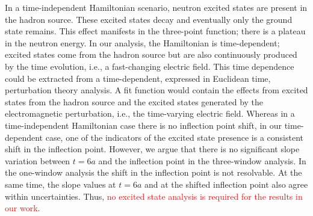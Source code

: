 In a time-independent Hamiltonian scenario, neutron excited states are present
in the hadron source. These excited states decay and eventually only the ground state
remains. This effect manifests in the three-point function; there is a plateau in the
neutron energy. 
In our analysis, the Hamiltonian is time-dependent; excited states 
come from the hadron source but are also continuously produced by the time 
evolution, i.e., a fast-changing electric field. This time dependence could be
extracted from a time-dependent, expressed in Euclidean time, perturbation theory
analysis. A fit function would contain the effects from excited states from the hadron
source and the excited states generated by the electromagnetic perturbation, i.e.,
the time-varying electric field. Whereas in a time-independent Hamiltonian case there
is no inflection point shift, in our time-dependent case, one of the indicators 
of the excited state presence is a consistent shift in the inflection point. However, we argue 
that there is no significant slope variation between $t=6a$ and the inflection point 
in the three-window analysis. In the one-window analysis the shift in the inflection point is
not resolvable. At the same time, the slope values at $t=6a$ and at the shifted inflection point also
agree within uncertainties. Thus, \textcolor{red}{no excited state analysis is required for the results in our work}.

